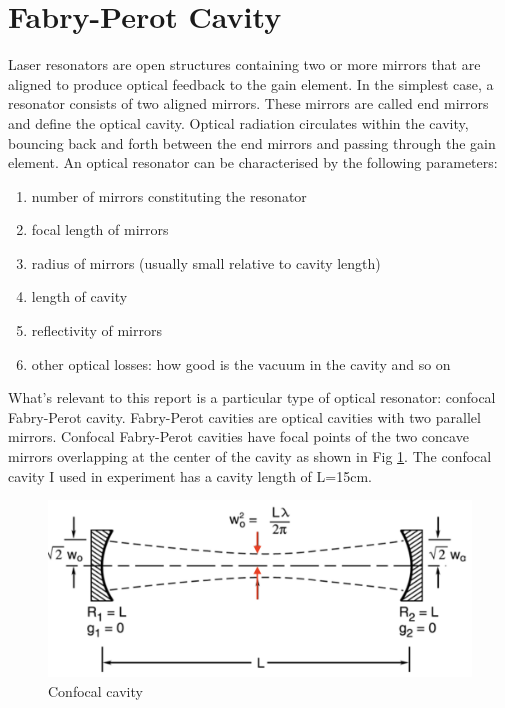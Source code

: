 \documentclass[11pt,A4Paper]{article}
\begin{document}
\section{Fabry-Perot Cavity}
Laser resonators are open structures containing two or more mirrors that are aligned to produce optical feedback to the gain element. In the simplest case, a resonator consists of two aligned mirrors. These mirrors are called end mirrors and define the optical cavity. Optical radiation circulates within the cavity, bouncing back and forth between the end mirrors and passing through the gain element. An optical resonator can be characterised by the following parameters: 
\begin{enumerate}
    \item number of mirrors constituting the resonator
    \item focal length of mirrors
    \item radius of mirrors (usually small relative to cavity length)
    \item length of cavity
    \item reflectivity of mirrors
    \item other optical losses: how good is the vacuum in the cavity and so on
\end{enumerate}
What's relevant to this report is a particular type of optical resonator: confocal Fabry-Perot cavity. Fabry-Perot cavities are optical cavities with two parallel mirrors. Confocal Fabry-Perot cavities have focal points of the two concave mirrors overlapping at the center of the cavity as shown in Fig \ref{fig:confocalCavity}. The confocal cavity I used in experiment has a cavity length of L=15cm. 

\begin{figure}[H]
    \centering
    \includegraphics[width = .8\textwidth]{confocalCavity.png}
    \caption{Confocal cavity}
    \label{fig:confocalCavity}
\end{figure}
\end{document}

